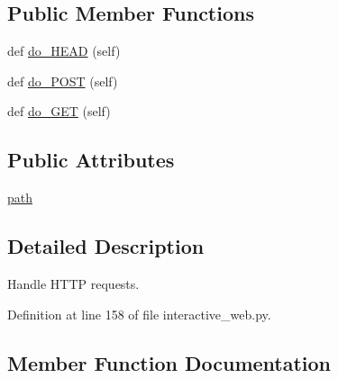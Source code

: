 \subsection*{Public Member Functions}
\begin{DoxyCompactItemize}
\item 
def \hyperlink{classparlai_1_1scripts_1_1interactive__web_1_1MyHandler_a2231328696ebba922f2e5e1d9b8ebb56}{do\+\_\+\+H\+E\+AD} (self)
\item 
def \hyperlink{classparlai_1_1scripts_1_1interactive__web_1_1MyHandler_abea6bbf8b4439489c05a388fa615506c}{do\+\_\+\+P\+O\+ST} (self)
\item 
def \hyperlink{classparlai_1_1scripts_1_1interactive__web_1_1MyHandler_aacb5ca9cbf2a9f2278d3b093e463ec00}{do\+\_\+\+G\+ET} (self)
\end{DoxyCompactItemize}
\subsection*{Public Attributes}
\begin{DoxyCompactItemize}
\item 
\hyperlink{classparlai_1_1scripts_1_1interactive__web_1_1MyHandler_ac1cd1a67cc1ed03620292e70d41125a0}{path}
\end{DoxyCompactItemize}


\subsection{Detailed Description}
\begin{DoxyVerb}Handle HTTP requests.\end{DoxyVerb}
 

Definition at line 158 of file interactive\+\_\+web.\+py.



\subsection{Member Function Documentation}
\mbox{\label{classparlai_1_1scripts_1_1interactive__web_1_1MyHandler_aacb5ca9cbf2a9f2278d3b093e463ec00}} 

